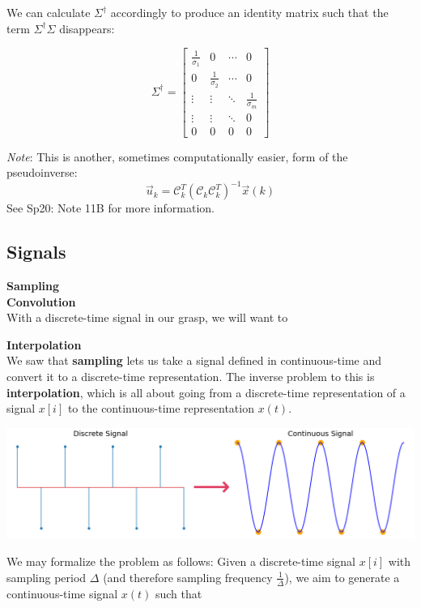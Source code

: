 We can calculate $\Sigma^{\dagger}$ accordingly to produce an identity matrix such that the term $\Sigma^{\dagger}\Sigma$ disappears:

$$\Sigma^{\dagger} = \begin{bmatrix} \frac{1}{\sigma_{1}} & 0 &  \cdots & 0 \\ 0 & \frac{1}{\sigma_{2}} & \cdots & 0 \\ \vdots & \vdots & \ddots & \frac{1}{\sigma_{m}} \\ 
    \vdots & \vdots & \ddots & 0 \\ 0 & 0 & 0 & 0 \end{bmatrix}$$

\textit{Note}: This is another, sometimes computationally easier, form of the pseudoinverse:
$$\vec{u}_k = \mathcal{C}_k^T(\mathcal{C}_k\mathcal{C}_k^T)^{-1}\vec{x}(k)$$
See Sp20: Note 11B for more information.

\newpage

\subsection*{Signals}
\textbf{Sampling} \\

\textbf{Convolution} \\
With a discrete-time signal in our grasp, we will want to 

\textbf{Interpolation} \\
We saw that \textbf{sampling} lets us take a signal defined in continuous-time and convert it to a discrete-time representation.
The inverse problem to this is \textbf{interpolation}, which is all about going from a discrete-time representation of a signal $x[i]$ to the continuous-time representation $x(t)$.

\includegraphics[width=\textwidth]{figures/interp_ex}

We may formalize the problem as follows: Given a discrete-time signal $x[i]$ with sampling period $\Delta$ (and therefore sampling frequency $\frac{1}{\Delta}$), we aim to generate a continuous-time signal $x(t)$ such that 

